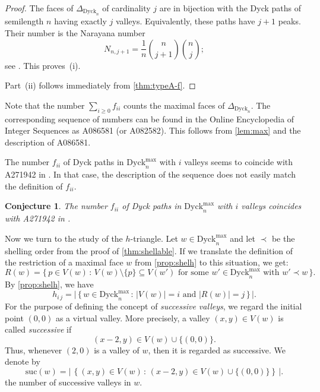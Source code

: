 \documentclass[11pt]{amsart}
\def\Dyck{\mathrm{Dyck}}
\def\suc{\mathrm{suc}}
\theoremstyle{plain}
\numberwithin{lemma}{\DefaultNumberTheoremWithin}
\numberwithin{theorem}{\DefaultNumberTheoremWithin}
\numberwithin{corollary}{\DefaultNumberTheoremWithin}
\numberwithin{proposition}{\DefaultNumberTheoremWithin}
\newtheorem{conjecture}{Conjecture}
\numberwithin{conjecture}{\DefaultNumberTheoremWithin}
\theoremstyle{definition}
\numberwithin{definition}{\DefaultNumberTheoremWithin}
\numberwithin{question}{\DefaultNumberTheoremWithin}
\numberwithin{problem}{\DefaultNumberTheoremWithin}
\theoremstyle{remark}
\numberwithin{remark}{\DefaultNumberTheoremWithin}
\numberwithin{example}{\DefaultNumberTheoremWithin}
\numberwithin{claim}{\DefaultNumberTheoremWithin}
\begin{document}
\begin{proof}
The faces of $\Delta_{\Dyck_n}$ of cardinality $j$ are in
bijection with the Dyck paths of semilength $n$ having exactly
$j$ valleys. Equivalently, these paths have $j+1$ peaks. Their
number is the Narayana number
\[
N_{n,j+1}
=
\frac{1}{n}
\binom{n}{j+1}\binom{n}{j};
\]
see \cite{Deu98}. This proves~(i).

Part~(ii) follows immediately from
\ref{thm:typeA-f}.

\end{proof}

  
Note that the number $\sum_{i \geq 0} f_{ii}$ counts the maximal faces of 
$\Delta_{\Dyck_n}$. The corresponding sequence of numbers can be found in 
the Online Encyclopedia of Integer Sequences \cite{OEIS} as A086581 (or A082582).
This follows from \ref{lem:max}
and the description of A086581.

The number $f_{ii}$ of Dyck paths in $\Dyck^{\max}_n$ with $i$ valleys seems to coincide with 
A271942 in \cite{OEIS}. In that case, the description of the sequence does not easily
match the definition of $f_{ii}$.

\begin{conjecture}
    The number $f_{ii}$ of Dyck paths in $\Dyck^{\max}_n$ with $i$ valleys coincides with 
    A271942 in \cite{OEIS}.
\end{conjecture}

Now we turn to the study of the $h$-triangle. 
Let $ w \in \Dyck_{n}^{\max} $ and let $\prec$ be the shelling order from 
the proof of \ref{thm:shellable}. If we translate the definition of
the restriction
of a maximal face $w$ from \ref{prop:shelh} to this situation, we get:
\[
R(w) = \big\{\,p \in V(w)\,:\,  V(w)\setminus\{p\} \subseteq V(w') \text{ for some } w' \in \Dyck_{n}^{\max} \text{ with } w' \prec w\,\big\}.
\]
By \ref{prop:shelh}, we have
$$
h_{i\,j} = \Big|\,\big\{\,w \in \Dyck_{n}^{\max} \,:\, |V(w)| = i \text{ and } |R(w)| = j\,\big\}\,\Big|.
$$
For the purpose of defining the concept of \textit{successive valleys}, we regard the initial point $(0,0)$ 
as a virtual valley. More precisely, a valley $(x,y)\in V(w)$ is called \emph{successive} if \[ (x-2,y)\in V(w)\cup\{(0,0)\}. \] Thus, whenever $(2,0)$ is a valley of $w$, then it is
regarded as successive. We denote by
\[
\suc(w)
=
\Big|\,\left\{
(x,y)\in V(w)
\,:\,
(x-2,y)\in V(w)\cup\{(0,0)\}
\right\}\,\Big|.
\] 
 the number of successive valleys in $w$.
\end{document}
